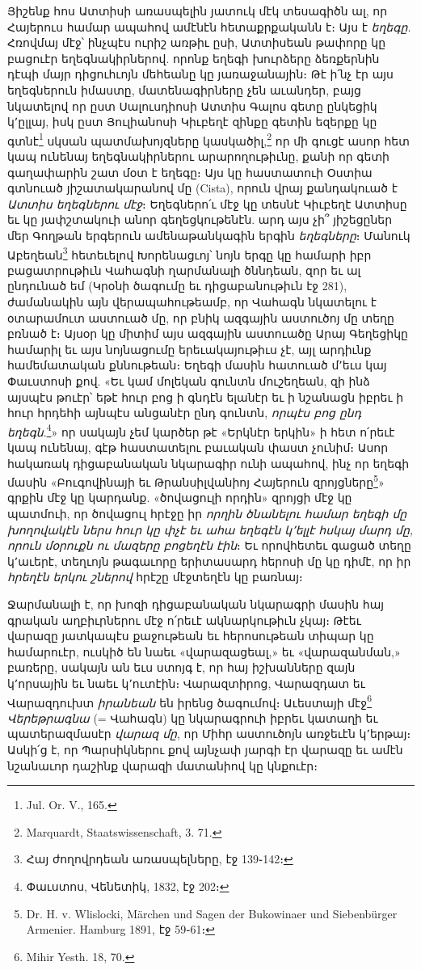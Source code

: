 \documentclass{article}
\begin{document}
{Յիշենք հոս Ատտիսի առասպելին յատուկ մէկ տեսագիծն ալ, որ Հայերուս համար ապահով ամէնէն հետաքրքականն է։ Այս է \emph{եղեգը.} Հռովմայ մէջ՝ ինչպէս ուրիշ առթիւ ըսի, Ատտիսեան թափորը կը բացուէր եղեգնակիրներով. որոնք եղեգի խուրձերը ձեռքերնին դէպի մայր դիցուհւոյն մեհեանը կը յառաջանային։ Թէ ի՛նչ էր այս եղեգներուն իմաստը, մատենագիրները չեն աւանդեր, բայց նկատելով որ ըստ Սալուսդիոսի Ատտիս Գալոս գետը ընկեցիկ կ՚ըլլայ, իսկ ըստ Յուլիանոսի Կիւբեղէ զինքը գետին եզերքը կը գտնէ\footnote{Jul. Or. V., 165.} սկսան պատմախոյզները կասկածիլ,\footnote{Marquardt, Staatswissenschaft, 3. 71.} որ մի գուցէ ասոր հետ կապ ունենայ եղեգնակիրներու արարողութիւնը, քանի որ գետի գաղափարին շատ մօտ է եղեգը։ Այս կը հաստատուի Օստիա գտնուած յիշատակարանով մը (Cista), որուն վրայ քանդակուած է \emph{Ատտիս եղեգներու մէջ}։ Եղեգներո՛ւ մէջ կը տեսնէ Կիւբեղէ Ատտիսը եւ կը յափշտակուի անոր գեղեցկութենէն. արդ այս չի՞ յիշեցըներ մեր Գողթան երգերուն ամենաթանկագին երգին \emph{եղեգները}։ Մանուկ Աբեղեան\footnote{Հայ ժողովրդեան առասպելները, էջ 139֊142։} հետեւելով Խորենացւոյ՝ նոյն երգը կը համարի իբր բացատրութիւն Վահագնի ղարմանալի ծննդեան, զոր եւ ալ ընդունած եմ (Կրօնի ծագումը եւ դիցաբանութիւն էջ 281), ժամանակին այն վերապահութեամբ, որ Վահագն նկատելու է օտարամուտ աստուած մը, որ բնիկ ազգային աստուծոյ մը տեղը բռնած է։ Այսօր կը միտիմ այս ազգային աստուածը Արայ Գեղեցիկը համարիլ եւ այս նոյնացումը երեւակայութիւս չէ, այլ արդիւնք համեմատական քննութեան։ Եղեգի մասին հատուած մ՚եւս կայ Փաւստոսի քով. «Եւ կամ մոլեկան գունտն մուշեղեան, զի ինձ այսպէս թուէր՝ եթէ հուր բոց ի գնդէն ելանէր եւ ի նշանացն իբրեւ ի հուր հրդեհի այնպէս անցանէր ընդ գունտն, \emph{որպէս բոց ընդ եղեգն}.\footnote{Փաւստոս, Վենետիկ, 1832, էջ 202։}» որ սակայն չեմ կարծեր թէ «Երկնէր երկին» ի հետ ո՛րեւէ կապ ունենայ, գէթ հաստատելու բաւական փաստ չունիմ։ Ասոր հակառակ դիցաբանական նկարագիր ունի ապահով, ինչ որ եղեգի մասին «Բուգովինայի եւ Թրանսիլվանիոյ Հայերուն զրոյցները\footnote{Dr. H. v. Wlislocki, Märchen und Sagen der Bukowinaer und Siebenbürger Armenier. Hamburg 1891, էջ 59֊61։}» գրքին մէջ կը կարդանք. «ծովացուլի որդին» զրոյցի մէջ կը պատմուի, որ ծովացուլ հրէջը իր \emph{որղին ծնանելու համար եղեգի մը խողովակէն ներս հուր կը փչէ եւ ահա եղեգէն կ՚ելլէ հսկայ մարդ մը, որուն մօրուքն ու մազերը բոցեղէն էին}։ Եւ որովհետեւ գացած տեղը կ՚աւերէ, տեղւոյն թագաւորը երիտասարդ հերոսի մը կը դիմէ, որ իր \emph{հրեղէն երկու շներով} հրէշը մէջտեղէն կը բառնայ։

Ջարմանալի է, որ խոզի դիցաբանական նկարագրի մասին հայ գրական աղբիւրներու մէջ ո՛րեւէ ակնարկութիւն չկայ։ Թէեւ վարազը յատկապէս քաջութեան եւ հերոսութեան տիպար կը համարուէր, ուսկիծ են նաեւ «վարազացեալ,» եւ «վարազանման,» բառերը, սակայն ան եւս ստոյգ է, որ հայ իշխանները զայն կ՚որսային եւ նաեւ կ՚ուտէին։ Վարազտիրոց, Վարազդատ եւ Վարազդուխտ \emph{իրանեան} են իրենց ծագումով։ Աւեստայի մէջ\footnote{Mihir Yesth. 18, 70.} \emph{Վերեթրագնա} (= Վահագն) կը նկարագրուի իբրեւ կատաղի եւ պատերազմասէր \emph{վարազ մը}, որ Միհր աստուծոյն առջեւէն կ՚երթայ։ Ասկի՛ց է, որ Պարսիկներու քով այնչափ յարգի էր վարազը եւ ամէն նշանաւոր դաշինք վարազի մատանիով կը կնքուէր։

}
\end{document}
